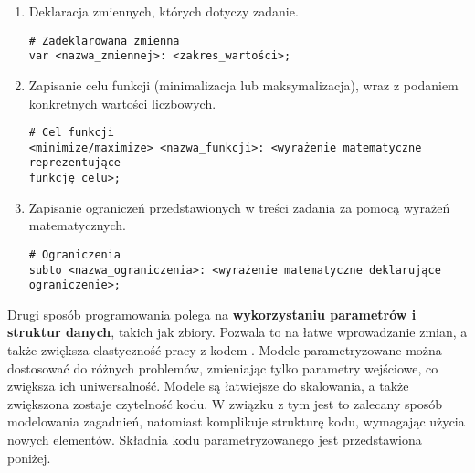 \begin{enumerate}
\item Deklaracja zmiennych, których dotyczy zadanie.

\begin{lstlisting}[language=zimpl]
# Zadeklarowana zmienna
var <nazwa_zmiennej>: <zakres_wartości>;
\end{lstlisting}

\item Zapisanie celu funkcji (minimalizacja lub maksymalizacja), wraz z podaniem konkretnych wartości liczbowych.

\begin{lstlisting}[language=zimpl]
# Cel funkcji
<minimize/maximize> <nazwa_funkcji>: <wyrażenie matematyczne reprezentujące
funkcję celu>;
\end{lstlisting}

\item Zapisanie ograniczeń przedstawionych w treści zadania za pomocą wyrażeń matematycznych.

\begin{lstlisting}[language=zimpl]
# Ograniczenia
subto <nazwa_ograniczenia>: <wyrażenie matematyczne deklarujące ograniczenie>;
\end{lstlisting}
\end{enumerate}

Drugi sposób programowania polega na \textbf{wykorzystaniu parametrów i struktur danych}, takich jak zbiory. Pozwala to na łatwe wprowadzanie zmian, a także zwiększa elastyczność pracy z kodem  . Modele parametryzowane można dostosować do różnych problemów, zmieniając tylko parametry wejściowe, co zwiększa ich uniwersalność. Modele są łatwiejsze do skalowania, a także zwiększona zostaje czytelność kodu. W związku z tym jest to zalecany sposób modelowania zagadnień, natomiast komplikuje strukturę kodu, wymagając użycia nowych elementów. %
Składnia kodu parametryzowanego jest przedstawiona poniżej.

